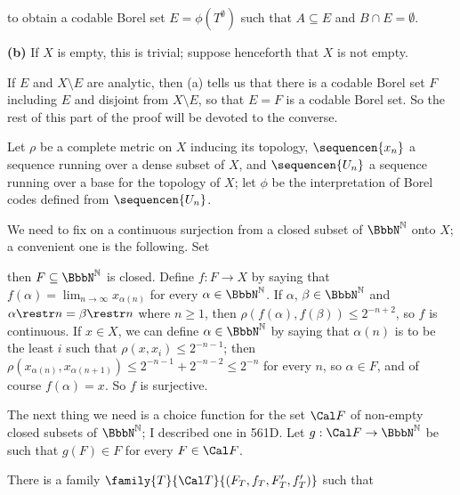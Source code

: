 {\noindent to obtain a codable Borel set $E=\phi(T^{\emptyset})$ such that
$A\subseteq E$ and $B\cap E=\emptyset$.

\medskip

{\bf (b)} If $X$ is empty, this is trivial;  suppose henceforth that
$X$ is not empty.

\medskip

 If $E$ and $X\setminus E$ are analytic, then (a) tells us
that there is a codable Borel set $F$ including $E$ and disjoint from
$X\setminus E$, so that $E=F$ is a codable Borel set.   So the rest of this
part of the proof will be devoted to the converse.

Let $\rho$ be a complete metric on $X$ inducing its
topology, $\sequencen{x_n}$ a sequence running over a dense subset of
$X$, and $\sequencen{U_n}$ a sequence running over a
base for the topology of $X$;  let $\phi$ be the interpretation of Borel
codes defined from $\sequencen{U_n}$.

\medskip

 We need to fix on a continuous surjection from a
closed subset of $\NN$ onto $X$;  a convenient one is the following.   Set


\noindent then $F\subseteq\NN$ is closed.   Define $f:F\to X$ by saying
that $f(\alpha)=\lim_{n\to\infty}x_{\alpha(n)}$ for every $\alpha\in\NN$.
If $\alpha$, $\beta\in\NN$ and $\alpha\restr n=\beta\restr n$ where
$n\ge 1$, then $\rho(f(\alpha),f(\beta))\le 2^{-n+2}$, so $f$ is
continuous.   If $x\in X$, we can define $\alpha\in\NN$ by saying that
$\alpha(n)$ is to be the least $i$ such that $\rho(x,x_i)\le 2^{-n-1}$;
then $\rho(x_{\alpha(n)},x_{\alpha(n+1)})\le 2^{-n-1}+2^{-n-2}\le 2^{-n}$
for every $n$, so $\alpha\in F$, and of course $f(\alpha)=x$.   So $f$ is
surjective.

The next thing we need is a choice function for the set $\Cal F$ of
non-empty closed subsets of $\NN$;  I described one in 561D.   Let
$g:\Cal F\to\NN$ be such that $g(F)\in F$ for every $F\in\Cal F$.

\medskip

There is a family $\family{T}{\Cal T}{(F_T,f_T,F'_T,f'_T)}$
such that



}
